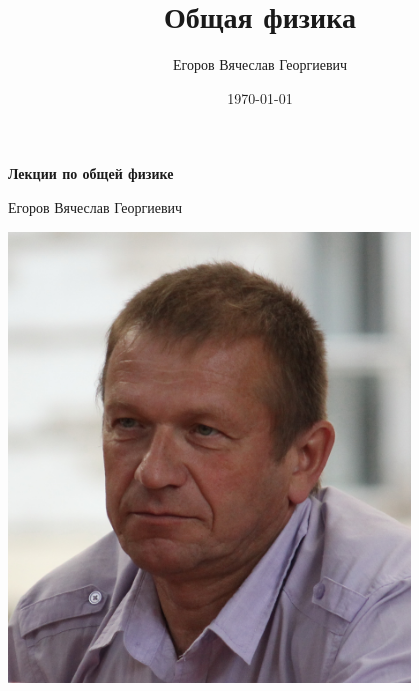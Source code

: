 \documentclass[12pt,epsfig,color,russian]{book}
\title{Общая физика}
\author{Егоров Вячеслав Георгиевич}
\date{\today} %
\begin{document}
\begin{titlepage}
    \centering
    
    {\Huge\bfseries Лекции по общей физике\par}
    \vspace{1.5cm}
    
    {\Large Егоров Вячеслав Георгиевич\par}
    \vspace{2cm}
    
    \includegraphics[width=0.8\textwidth]{photos/Egorov.jpg}
    
    
\end{titlepage}

\end{document}
